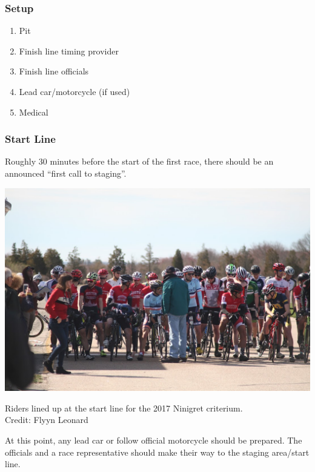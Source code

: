 \documentclass[
  letterpaper, %
  fontsize=10pt, %
  twoside=true,
  chapterentrydots=true, %
  numbers=noenddot,
  fontmethod=tex,
]{kaobook}
\begin{document}
\subsubsection{Setup}

\begin{enumerate}
  \item Pit
  \item Finish line timing provider
  \item Finish line officials
  \item Lead car/motorcycle (if used)
  \item Medical
\end{enumerate}

\subsubsection{Start Line}


Roughly 30 minutes %
before the start of the first race, there should be an announced ``first call to staging''.

\begin{marginfigure}
\includegraphics{2017_start_line.jpg}
\caption[Riders lined up at a criterium start line]{
          Riders lined up at the start line for the 2017 Ninigret criterium.\\
          Credit: Flyyn Leonard}
\end{marginfigure}

At this point, any lead car or follow official motorcycle should be prepared.
The officials and a race representative should make their way to the staging area/start line.
\end{document}
